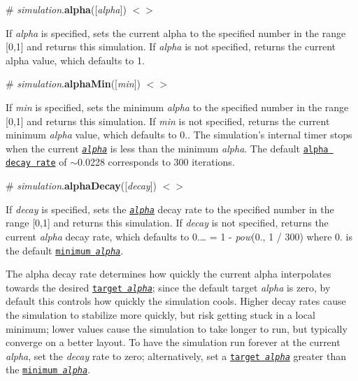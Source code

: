 \label{_simulation_alpha}%
\# {\itshape simulation}.{\bfseries alpha}(\mbox{[}{\itshape alpha}\mbox{]}) \href{https://github.com/d3/d3-force/blob/master/src/simulation.js#L92}{\tt $<$$>$}

If {\itshape alpha} is specified, sets the current alpha to the specified number in the range \mbox{[}0,1\mbox{]} and returns this simulation. If {\itshape alpha} is not specified, returns the current alpha value, which defaults to 1.

\label{_simulation_alphaMin}%
\# {\itshape simulation}.{\bfseries alpha\+Min}(\mbox{[}{\itshape min}\mbox{]}) \href{https://github.com/d3/d3-force/blob/master/src/simulation.js#L96}{\tt $<$$>$}

If {\itshape min} is specified, sets the minimum {\itshape alpha} to the specified number in the range \mbox{[}0,1\mbox{]} and returns this simulation. If {\itshape min} is not specified, returns the current minimum {\itshape alpha} value, which defaults to 0.. The simulation’s internal timer stops when the current \href{#simulation_alpha}{\tt {\itshape alpha}} is less than the minimum {\itshape alpha}. The default \href{#simulation_alphaDecay}{\tt alpha decay rate} of $\sim$0.0228 corresponds to 300 iterations.

\label{_simulation_alphaDecay}%
\# {\itshape simulation}.{\bfseries alpha\+Decay}(\mbox{[}{\itshape decay}\mbox{]}) \href{https://github.com/d3/d3-force/blob/master/src/simulation.js#L100}{\tt $<$$>$}

If {\itshape decay} is specified, sets the \href{#simulation_alpha}{\tt {\itshape alpha}} decay rate to the specified number in the range \mbox{[}0,1\mbox{]} and returns this simulation. If {\itshape decay} is not specified, returns the current {\itshape alpha} decay rate, which defaults to 0.… = 1 -\/ {\itshape pow}(0., 1 / 300) where 0. is the default \href{#simulation_alphaMin}{\tt minimum {\itshape alpha}}.

The alpha decay rate determines how quickly the current alpha interpolates towards the desired \href{#simulation_alphaTarget}{\tt target {\itshape alpha}}; since the default target {\itshape alpha} is zero, by default this controls how quickly the simulation cools. Higher decay rates cause the simulation to stabilize more quickly, but risk getting stuck in a local minimum; lower values cause the simulation to take longer to run, but typically converge on a better layout. To have the simulation run forever at the current {\itshape alpha}, set the {\itshape decay} rate to zero; alternatively, set a \href{#simulation_alphaTarget}{\tt target {\itshape alpha}} greater than the \href{#simulation_alphaMin}{\tt minimum {\itshape alpha}}.

